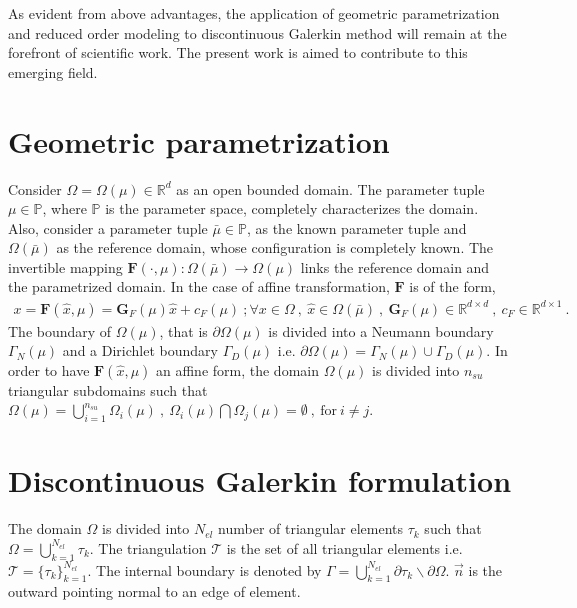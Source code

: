\documentclass[graybox]{svmult}
\begin{document}
As evident from above advantages, the application of geometric parametrization and reduced order modeling to discontinuous Galerkin method will remain at the forefront of scientific work. The present work is aimed to contribute to this emerging field. 

\section{Geometric parametrization}\label{geometric_parametrization_section}

Consider $\Omega = \Omega(\mu) \in \mathbb{R}^d$ as an open bounded domain. The parameter tuple $\mu \in \mathbb{P}$, where $\mathbb{P}$ is the parameter space, completely characterizes the domain. Also, consider a parameter tuple $\bar{\mu} \in \mathbb{P}$, as the known parameter tuple and $\Omega(\bar{\mu})$ as the reference domain, whose configuration is completely known. The invertible mapping $\bm{F}(\cdot,\mu) : \Omega(\bar{\mu}) \rightarrow \Omega(\mu)$ links the reference domain and the parametrized domain. In the case of affine transformation, $\bm{F}$ is of the form,
\begin{equation*}\label{affine_F}
\begin{split}
x = \bm{F}(\hat{x},\mu) = \bm{G}_F(\mu)\hat{x} + c_F(\mu) \ ; \forall x \in \Omega \ , \ \hat{x} \in \Omega(\bar{\mu}) \ , \ \bm{G}_F(\mu) \in \mathbb{R}^{d \times d} \ , \ c_F \in \mathbb{R}^{d \times 1} \ .
\end{split}
\end{equation*}
The boundary of $\Omega(\mu)$, that is $\partial \Omega(\mu)$ is divided into a  Neumann boundary $\Gamma_N(\mu)$ and a Dirichlet boundary $\Gamma_D(\mu)$ i.e. $\partial \Omega(\mu) = \Gamma_N(\mu) \cup \Gamma_D(\mu)$. In order to have $\bm{F}(\hat{x},\mu)$ an affine form, the domain $\Omega(\mu)$ is divided into $n_{su}$ triangular subdomains such that $\Omega(\mu) = \bigcup\limits_{i=1}^{n_{su}} \Omega_i(\mu) \ , \ \Omega_i(\mu) \bigcap \Omega_j(\mu) = \emptyset \ , \ \text{for} \ i \neq j$.

\section{Discontinuous Galerkin formulation}
\label{DG_formulation}

The domain $\Omega$ is divided into $N_{el}$ number of triangular elements $\tau_k$ such that $\Omega = \bigcup\limits_{k=1}^{N_{el}} \tau_k$. The triangulation $\mathcal{T}$ is the set of all triangular elements i.e. $\mathcal{T} = \lbrace \tau_k \rbrace_{k=1}^{N_{el}}$. The internal boundary is denoted by $\Gamma = \bigcup\limits_{k=1}^{N_{el}} \partial \tau_k \backslash \partial \Omega$. $\overrightarrow{n}$ is the outward pointing normal to an edge of element.
\end{document}
